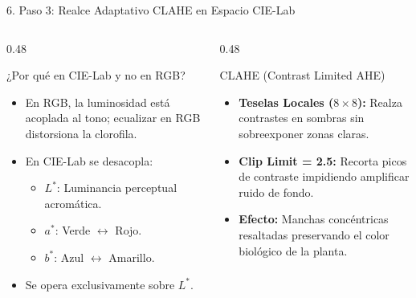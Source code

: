 \documentclass[aspectratio=169,10pt]{beamer}
\begin{document}
\begin{frame}{6. Paso 3: Realce Adaptativo CLAHE en Espacio CIE-Lab}
    \begin{columns}[T]
        \begin{column}{0.48\textwidth}
            \begin{block}{¿Por qué en CIE-Lab y no en RGB?}
                \begin{itemize}
                    \item En RGB, la luminosidad está acoplada al tono; ecualizar en RGB distorsiona la clorofila.
                    \item En CIE-Lab se desacopla:
                    \begin{itemize}
                        \item $L^*$: Luminancia perceptual acromática.
                        \item $a^*$: Verde $\leftrightarrow$ Rojo.
                        \item $b^*$: Azul $\leftrightarrow$ Amarillo.
                    \end{itemize}
                    \item Se opera exclusivamente sobre $L^*$.
                \end{itemize}
            \end{block}
        \end{column}
        
        \begin{column}{0.48\textwidth}
            \begin{exampleblock}{CLAHE (Contrast Limited AHE)}
                \begin{itemize}
                    \item \textbf{Teselas Locales ($8\times8$):} Realza contrastes en sombras sin sobreexponer zonas claras.
                    \item \textbf{Clip Limit = 2.5:} Recorta picos de contraste impidiendo amplificar ruido de fondo.
                    \item \textbf{Efecto:} Manchas concéntricas resaltadas preservando el color biológico de la planta.
                \end{itemize}
            \end{exampleblock}
        \end{column}
    \end{columns}
\end{frame}
\end{document}
